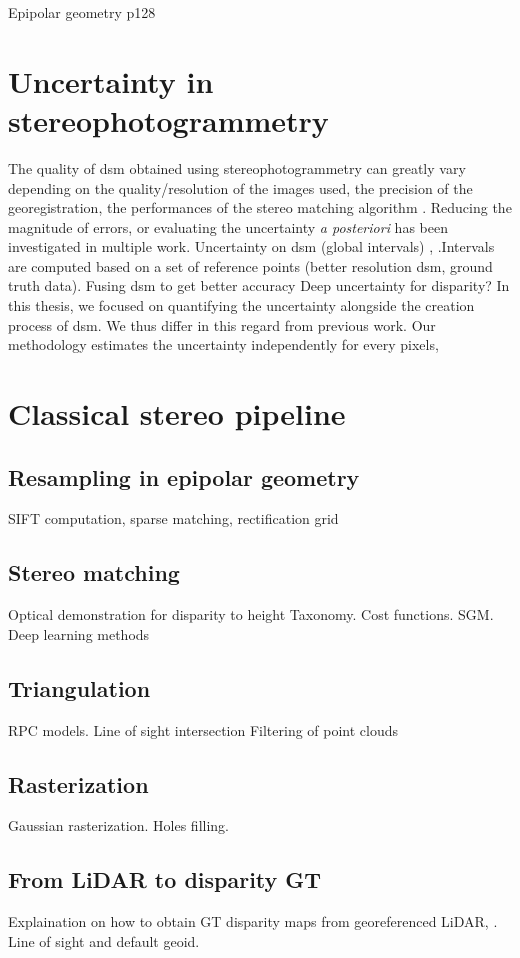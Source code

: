
Epipolar geometry p128 \cite{cnes_imagerie_2008}

\section{Uncertainty in stereophotogrammetry}
The quality of \acrshort{dsm} obtained using stereophotogrammetry can greatly vary depending on the quality/resolution of the images used, the precision of the georegistration, the performances of the stereo matching algorithm \etc. Reducing the magnitude of errors, or evaluating the uncertainty \textit{a posteriori} has been investigated in multiple work.
Uncertainty on \acrshort{dsm} (global intervals) \cite{hugonnet_uncertainty_2022, deschamps-berger_apport_2021, wang_robust_2015}, \cite{oksanen_digital_2006} \cite{panagiotakis_validation_2018}.Intervals are computed based on a set of reference points (better resolution \acrshort{dsm}, ground truth data).
Fusing \acrshort{dsm} to get better accuracy \cite{qin_uncertainty-guided_2022}
\cite{hu_quantitative_2012,poggi_confidence_2021}
Deep uncertainty for disparity?
In this thesis, we focused on quantifying the uncertainty alongside the creation process of \acrshort{dsm}. We thus differ in this regard from previous work. Our methodology estimates the uncertainty independently for every pixels, 

\section{Classical stereo pipeline}\label{sec:classical_stero_pipeline}
\subsection{Resampling in epipolar geometry}
SIFT computation, sparse matching, rectification grid
\subsection{Stereo matching}
Optical demonstration for disparity to height
Taxonomy. Cost functions. SGM. Deep learning methods
\subsection{Triangulation}
RPC models. Line of sight intersection
Filtering of point clouds
\subsection{Rasterization}
Gaussian rasterization. Holes filling.  
\subsection{From LiDAR to disparity GT}
Explaination on how to obtain GT disparity maps from georeferenced LiDAR, \cite{cournet_ground_2020}. Line of sight and default geoid. 

\pagebreak